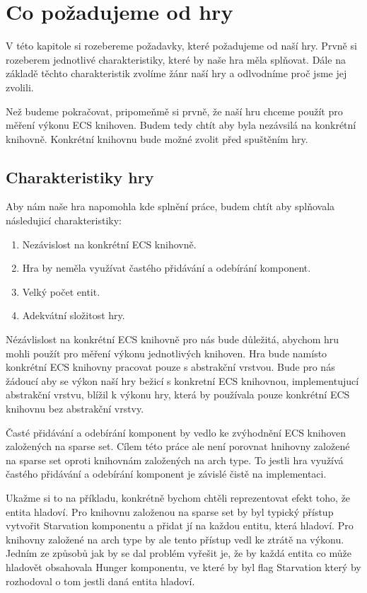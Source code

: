 \chapter{Co požadujeme od hry}
V této kapitole si rozebereme požadavky, které požadujeme od naší hry. Prvně si rozeberem jednotlivé charakteristiky, které by naše hra měla splňovat. Dále na základě těchto charakteristik zvolíme žánr naší hry a odlvodníme proč jsme jej zvolili.

Než budeme pokračovat, pripomeňmě si prvně, že naší hru chceme použít pro měření výkonu ECS knihoven. Budem tedy chtít aby byla nezávsilá na konkrétní knihovně. Konkrétní knihovnu bude možné zvolit před spuštěním hry.

\section{Charakteristiky hry}
Aby nám naše hra napomohla kde splnění práce, budem chtít aby splňovala následujicí charakteristiky:

\begin{enumerate}
    \item Nezávislost na konkrétní ECS knihovně.
    \item Hra by neměla využívat častého přidávání a odebírání komponent.
    \item Velký počet entit.
    \item Adekvátní složitost hry.
\end{enumerate}

Nézávlislost na konkrétní ECS knihovně pro nás bude důležitá, abychom hru mohli použít pro měření výkonu jednotlivých knihoven. Hra bude namísto konkrétní ECS knihovny pracovat pouze s abstrakční vrstvou. Bude pro nás žádoucí aby se výkon naší hry bežicí s konkretní ECS knihovnou, implementujucí abstrakční vrstvu, blížil k výkonu hry, která by používala pouze konkrétní ECS knihovnu bez abstrakční vrstvy.

Časté přidávání a odebírání komponent by vedlo ke zvýhodnění ECS knihoven založených na sparse set. Cílem této práce ale není porovnat hnihovny založené na sparse set oproti knihovnám založených na arch type. To jestli hra využívá častého přidávání a odebírání komponent je závislé čistě na implementaci. 

Ukažme si to na příkladu, konkrétně bychom chtěli reprezentovat efekt toho, že entita hladoví. Pro knihovnu založenou na sparse set by byl typický přístup vytvořit Starvation komponentu a přidat jí na každou entitu, která hladoví. Pro knihovny založené na arch type by ale tento přístup vedl ke ztrátě na výkonu. Jedním ze způsobů jak by se dal problém vyřešit je, že by každá entita co může hladovět obsahovala Hunger komponentu, ve které by byl flag Starvation který by rozhodoval o tom jestli daná entita hladoví.

